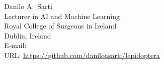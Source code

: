 \documentclass[article]{jss}
\begin{document}



\begin{Address}
Danilo A.~Sarti\\
Lecturer in AI and Machine Learning\\
Royal College of Surgeons in Ireland\\
Dublin, Ireland\\
E-mail: \\
URL: \url{https://github.com/daniloasarti/lepidoptera}
\end{Address}
\end{document}
